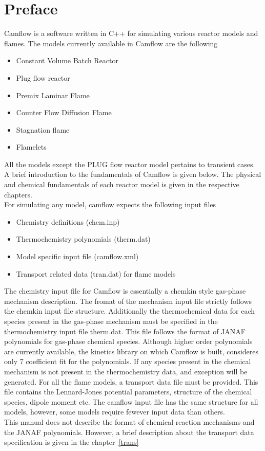 \newpage
\section*{Preface}
Camflow is a software written in C++ for simulating various reactor models and flames. The models currently available in Camflow are the following
\begin{itemize}
 \item Constant Volume Batch Reactor
 \item Plug flow reactor
 \item Premix Laminar Flame
 \item Counter Flow Diffusion Flame
 \item Stagnation flame
 \item Flamelets
\end{itemize}

All the models except the PLUG flow reactor model pertains to transient cases. A brief introduction to the fundamentals of Camflow is given below. The physical and chemical fundamentals of each reactor model is given in the respective chapters. \\

For simulating any model, camflow expects the following input files
\begin{itemize}
 \item Chemistry definitions (chem.inp)
\item Thermochemistry polynomials (therm.dat)
\item Model specific input file (camflow.xml)
\item Transport related data (tran.dat) for flame models
\end{itemize}

The chemistry input file for Camflow is essentially a chemkin style gas-phase mechanism description. The fromat of the mechanism input file strictly follows the chemkin input file structure. Additionally the thermochemical data for each species present in the gas-phase mechanism must be specified in the thermochemistry input file therm.dat. This file follows the format of  JANAF polynomials for gas-phase chemical species. Although higher order polynomials are currently available, the kinetics library on which Camflow is built, consideres only 7 coefficient fit for the polynomials. If any species present in the chemical mechanism is not present in the thermochemistry data, and exception will be generated. For all the flame models, a transport data file must be provided. This file contains the Lennard-Jones potential parameters, structure of the chemical species, dipole moment etc. The camflow input file has the same structure for all models, however, some models require fewever input data than others. \\

This manual does not describe the format of chemical reaction mechanisms and the JANAF polynomials. However, a brief description about the transport data specification is given in the chapter~\ref{trans}

